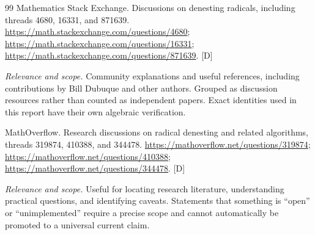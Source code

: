 \documentclass[11pt,letterpaper]{article}
\numberwithin{equation}{section}
\theoremstyle{definition}
\theoremstyle{remark}
\newcommand{\status}[1]{\textsf{\small[#1]}}
\newcommand{\entrynote}[1]{\par\smallskip\noindent\emph{Relevance and scope.} #1}
\begin{document}
\begin{thebibliography}{99}
Mathematics Stack Exchange. Discussions on denesting radicals, including threads 4680, 16331, and 871639. \url{https://math.stackexchange.com/questions/4680}; \url{https://math.stackexchange.com/questions/16331}; \url{https://math.stackexchange.com/questions/871639}. \status{D}
\entrynote{Community explanations and useful references, including contributions by Bill Dubuque and other authors. Grouped as discussion resources rather than counted as independent papers. Exact identities used in this report have their own algebraic verification.}

MathOverflow. Research discussions on radical denesting and related algorithms, threads 319874, 410388, and 344478. \url{https://mathoverflow.net/questions/319874}; \url{https://mathoverflow.net/questions/410388}; \url{https://mathoverflow.net/questions/344478}. \status{D}
\entrynote{Useful for locating research literature, understanding practical questions, and identifying caveats. Statements that something is ``open'' or ``unimplemented'' require a precise scope and cannot automatically be promoted to a universal current claim.}

\end{thebibliography}
\end{document}

